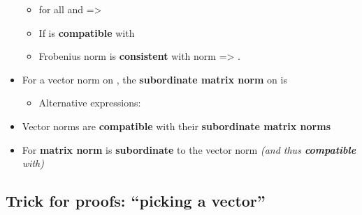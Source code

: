\begin{itemize}
  \begin{itemize}
  
  \item
    for all  and
     =\textgreater{}
  \item
    If  is \textbf{compatible} with
  \item
    Frobenius norm is \textbf{consistent} with  norm
    =\textgreater{} .
  \end{itemize}
\item
  For a vector norm \iMbox{\|\cdot\|} on , the
  \textbf{subordinate matrix norm} \iMbox{\|\cdot\|} on
   is

  \begin{itemize}
  
  \item
    Alternative expressions:
  \end{itemize}
\item
  Vector norms are \textbf{compatible} with their \textbf{subordinate
  matrix norms}
\item
  For  \textbf{matrix norm}  is
  \textbf{subordinate} to the vector norm  \emph{(and
  thus \textbf{compatible} with)}
\end{itemize}

\subsection*{Trick for proofs: ``picking a
vector''}

